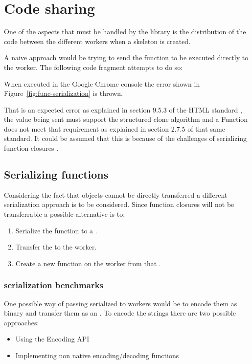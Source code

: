 \section{Code sharing}

One of the aspects that must be handled by the library is the distribution of the code between the different workers when a skeleton is created.

A naive approach would be trying to send the function to be executed directly to the worker. The following code fragment attempts to do so:


When executed in the Google Chrome console the error shown in Figure~\ref{fig:func-serialization} is thrown.

That is an expected error as explained in section 9.5.3 of the HTML standard \cite{html-whatwg}, the value being sent must support the structured clone algorithm and a Function does not meet that requirement as explained in section 2.7.5 of that same standard. It could be assumed that this is because of the challenges of serializing function closures \cite{cloud-haskell} \cite{distributed-scheme}.

\subsection{Serializing functions}
Considering the fact that \tfunction{} objects cannot be directly transferred a different serialization approach is to be considered. Since function closures will not be transferrable a possible alternative is to:
\begin{enumerate}
  \item Serialize the function to a \tstring{}.
  \item Transfer the \tstring{} to the worker.
  \item Create a new function on the worker from that \tstring{}.
\end{enumerate}


\subsubsection{\tstring{} serialization benchmarks}
One possible way of passing serialized \tfunction{} to workers would be to encode them as binary and transfer them as an \tabuffer{}. To encode the strings there are two possible approaches:
\begin{itemize}
  \item Using the Encoding API\cite{encoding-api}
  \item Implementing non native encoding/decoding functions
\end{itemize}

